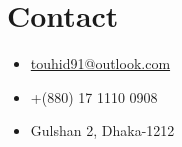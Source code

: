 \section{Contact}

\begin{itemize}
  \item
    \hyperlink{mailto:touhid91@outlook.com}{touhid91@outlook.com}

  \item
    +(880) 17 1110 0908

  \item
    Gulshan 2, Dhaka-1212
\end{itemize}
